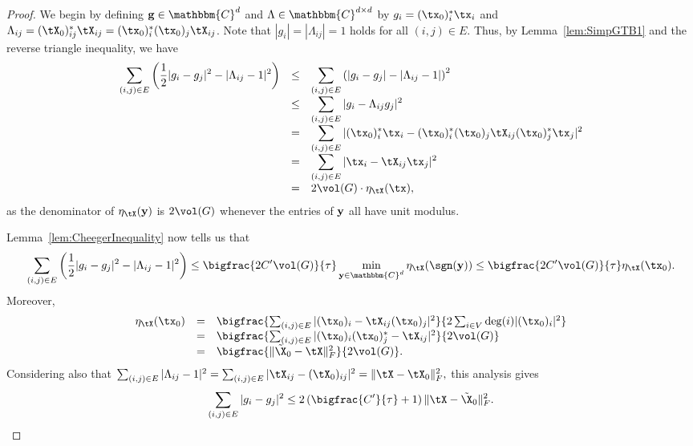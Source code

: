 \begin{proof}  We begin by defining ${\bf g} \in \mathbbm{C}^d$ and $\Lambda \in \mathbbm{C}^{d \times d}$ by $g_i = (\tx_0)_i^* \tx_i$ and $\Lambda_{ij} = (\tX_0)^*_{ij} \tX_{ij} = (\tx_0)_i^* (\tx_0)_j \tX_{ij}$.  Note that $|g_i| = |\Lambda_{ij}| = 1$ holds for all $(i,j) \in E$.  Thus, by Lemma~\ref{lem:SimpGTB1} and the reverse triangle inequality, we have 
\[\everymath{\displaystyle}\begin{array}{rcl}%
\sum_{(i, j) \in E}  \left(\frac{1}{2} |g_i - g_j|^2 - |\Lambda_{ij} - 1|^2\right) & \le & \sum_{(i, j) \in E}  \left( |g_i - g_j| - |\Lambda_{ij} - 1|\right)^2 \\%
 & \le & \sum_{(i, j) \in E}  |g_i - \Lambda_{ij}g_j|^2 \\%
& = & \sum_{(i, j) \in E}  |(\tx_0)_i^* \tx_i - (\tx_0)_i^* (\tx_0)_j \tX_{ij}(\tx_0)_j^* \tx_j|^2 \\%
& = & \sum_{(i, j) \in E}  |\tx_i - \tX_{ij} \tx_j |^2 \\%
& = & 2 \vol(G) \cdot \eta_{\tX}(\tx),%
\end{array}\]%
as the denominator of $\eta_{\tX}({\bf y})$ is $2\vol(G)$ whenever the entries of ${\bf y}$ all have unit modulus.

Lemma~\ref{lem:CheegerInequality} now tells us that 
\[ \sum_{(i, j) \in E}  \left(\frac{1}{2} |g_i - g_j|^2 - |\Lambda_{ij} - 1|^2\right) \le \bigfrac{2 C' \vol(G)}{\tau} \min_{{\bf y} \in \mathbbm{C}^d} \eta_{\tX}( \sgn({\bf y}) ) \le \bigfrac{2C' \vol(G)}{\tau} \eta_{\tX}(\tx_0).\] 
Moreover,
\[\begin{array}{rcl}%
\eta_{\tX}(\tx_0) & = & \bigfrac{\sum_{(i, j) \in E} |(\tx_0)_i - \tX_{ij} (\tx_0)_j |^2}{2 \sum_{i \in V} \deg(i) |(\tx_0)_i|^2} \\%
& = & \bigfrac{\sum_{(i, j) \in E} |(\tx_0)_i (\tx_0)^*_j - \tX_{ij}|^2}{2 \vol(G)} \\%
& = & \bigfrac{ \| \tilde{\X}_0 - \tX \|_F^2}{2 \vol(G)}.%
\end{array}\]%
Considering also that $\sum_{(i, j) \in E} |\Lambda_{ij} - 1|^2 = \sum_{(i, j) \in E} |\tX_{ij} - (\tX_0)_{ij}|^2 = \| \tX - \tX_0 \|_F^2,$ this analysis gives 
\[\sum_{(i, j) \in E} |g_i - g_j|^2 \le 2 \left(\bigfrac{C'}{\tau} + 1\right) \|\tX - \tilde{\X}_0\|_F^2.\]


\end{proof}
